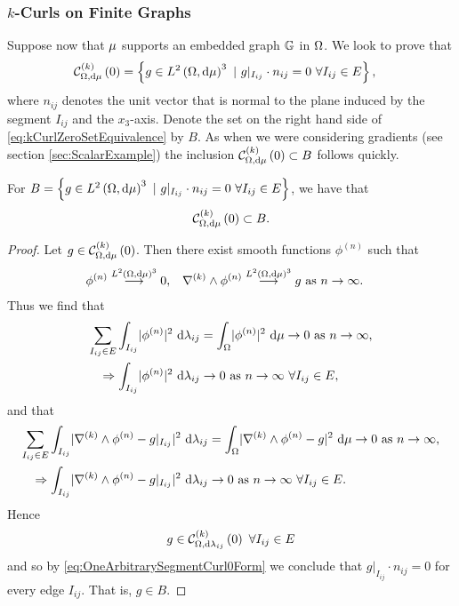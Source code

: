 \subsubsection{$k$-Curls on Finite Graphs}
Suppose now that $\mu$ supports an embedded graph $\mathbb{G}$ in $\Omega$.
We look to prove that
\begin{align} \label{eq:kCurlZeroSetEquivalence}
	\mathcal{C}_{ \Omega, \mathrm{d}\mu}^{(k)}\left( 0 \right) &= \left\{ g\in L^{2}\left( \Omega,\mathrm{d}\mu \right)^3 \ \vert \ g\vert_{I_{ij}}\cdot n_{ij} = 0 \ \forall I_{ij}\in E \right\},
\end{align}
where $n_{ij}$ denotes the unit vector that is normal to the plane induced by the segment $I_{ij}$ and the $x_3$-axis.
Denote the set on the right hand side of \eqref{eq:kCurlZeroSetEquivalence} by $B$.
As when we were considering gradients (see section \ref{sec:ScalarExample}) the inclusion $\mathcal{C}_{ \Omega, \mathrm{d}\mu}^{(k)}\left( 0 \right)\subset B$ follows quickly.
\begin{prop} \label{prop:Curl0IncB}
	For $B = \clbracs{g\in\ltwo{\ddom}{\ddmes}^3 \ \vert \ g\vert_{I_{ij}}\cdot n_{ij} = 0 \ \forall I_{ij}\in E}$, we have that
	\begin{align*}
		\mathcal{C}_{ \Omega, \mathrm{d}\mu}^{(k)}\left( 0 \right)\subset B.
	\end{align*}
\end{prop}
\begin{proof}
	Let $g\in\mathcal{C}_{ \Omega, \mathrm{d}\mu}^{(k)}\left( 0 \right)$.
	Then there exist smooth functions $\phi^{(n)}$ such that
	\begin{align*}
		\phi^{(n)} \overset{L^{2}\left( \Omega,\mathrm{d}\mu \right)^3}{\longrightarrow} 0, 
		&\quad \nabla_{}^{(k)}\wedge\phi^{(n)} \overset{L^{2}\left( \Omega,\mathrm{d}\mu \right)^3}{\longrightarrow} g \ \text{as} \ n \rightarrow\infty.
	\end{align*}
	Thus we find that
	\begin{align*}
		\sum_{I_{ij}\in E}\int_{I_{ij}}\lvert \phi^{(n)} \rvert^2 \ \mathrm{d}\lambda_{ij} &= \int_{\Omega}\lvert \phi^{(n)} \rvert^2 \ \mathrm{d}\mu \rightarrow 0 \ \text{as} \ n \rightarrow\infty, \\
		\Rightarrow \int_{I_{ij}}\lvert \phi^{(n)} \rvert^2 \ \mathrm{d}\lambda_{ij} &\rightarrow0 \ \text{as} \ n \rightarrow\infty \ \forall I_{ij}\in E,
	\end{align*}
	and that
	\begin{align*}
		\sum_{I_{ij}\in E}\int_{I_{ij}}\lvert \nabla_{}^{(k)}\wedge\phi^{(n)}-g\vert_{I_{ij}} \rvert^2 \ \mathrm{d}\lambda_{ij} &= \int_{\Omega}\lvert \nabla_{}^{(k)}\wedge\phi^{(n)}-g \rvert^2 \ \mathrm{d}\mu \rightarrow 0 \ \text{as} \ n \rightarrow\infty, \\
		\Rightarrow \int_{I_{ij}}\lvert \nabla_{}^{(k)}\wedge\phi^{(n)}-g\vert_{I_{ij}} \rvert^2 \ \mathrm{d}\lambda_{ij} &\rightarrow0 \ \text{as} \ n \rightarrow\infty \ \forall I_{ij}\in E.
	\end{align*}
	Hence 
	\begin{align*}
			g\in\mathcal{C}_{ \Omega, \mathrm{d}\lambda_{ij}}^{(k)}\left( 0 \right) \ \forall I_{ij}\in E
	\end{align*}
	and so by \eqref{eq:OneArbitrarySegmentCurl0Form} we conclude that $g\vert_{I_{ij}}\cdot n_{ij} = 0$ for every edge $I_{ij}$.
	That is, $g\in B$.
\end{proof}

